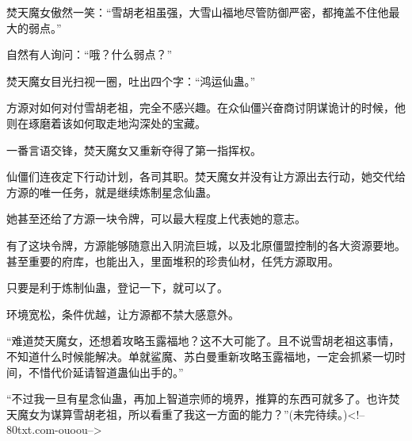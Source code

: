 \begin{this_body}
焚天魔女傲然一笑：“雪胡老祖虽强，大雪山福地尽管防御严密，都掩盖不住他最大的弱点。”

自然有人询问：“哦？什么弱点？”

焚天魔女目光扫视一圈，吐出四个字：“鸿运仙蛊。”

方源对如何对付雪胡老祖，完全不感兴趣。在众仙僵兴奋商讨阴谋诡计的时候，他则在琢磨着该如何取走地沟深处的宝藏。

一番言语交锋，焚天魔女又重新夺得了第一指挥权。

仙僵们连夜定下行动计划，各司其职。焚天魔女并没有让方源出去行动，她交代给方源的唯一任务，就是继续炼制星念仙蛊。

她甚至还给了方源一块令牌，可以最大程度上代表她的意志。

有了这块令牌，方源能够随意出入阴流巨城，以及北原僵盟控制的各大资源要地。甚至重要的府库，也能出入，里面堆积的珍贵仙材，任凭方源取用。

只要是利于炼制仙蛊，登记一下，就可以了。

环境宽松，条件优越，让方源都不禁大感意外。

“难道焚天魔女，还想着攻略玉露福地？这不大可能了。且不说雪胡老祖这事情，不知道什么时候能解决。单就鲨魔、苏白曼重新攻略玉露福地，一定会抓紧一切时间，不惜代价延请智道蛊仙出手的。”

“不过我一旦有星念仙蛊，再加上智道宗师的境界，推算的东西可就多了。也许焚天魔女为谋算雪胡老祖，所以看重了我这一方面的能力？”(未完待续。)<!--80txt.com-ouoou-->

\end{this_body}

